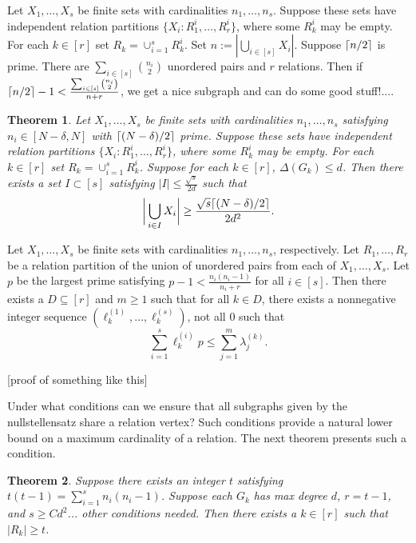 \documentclass[12pt]{article}
\DeclarePairedDelimiter\ceil{\lceil}{\rceil}
\newtheorem{thm}{Theorem}[section] %
\theoremstyle{definition}
\begin{document}
	
	\iffalse
	Let $X_1,\ldots, X_s$ be finite sets with cardinalities $n_1,\ldots, n_s$.  Suppose these sets have independent relation partitions $\{X_i: R_1^{i},\ldots, R_r^{i}\}$, where some $R_k^{i}$ may be empty.  For each $k \in [r]$ set $R_k = \cup_{i=1}^s R_k^i$.  Set $n:= |\bigcup_{i \in [s]}X_i|$.  Suppose $\ceil{n/2}$ is prime.  There are $\sum_{i \in [s]}{n_i \choose 2}$ unordered pairs and $r$ relations.  Then if $\ceil{n/2} -1 < \frac{\sum_{i \in [s]}{n_i \choose 2}}{n+r}$, we get a nice subgraph and can do some good stuff!....
	
	\begin{thm}
		Let $X_1,\ldots, X_s$ be finite sets with cardinalities $n_1,\ldots, n_s$ satisfying $n_i \in [N-\delta, N]$ with $\ceil{(N-\delta)/2}$ prime.  Suppose these sets have independent relation partitions $\{X_i: R_1^{i},\ldots, R_r^{i}\}$, where some $R_k^{i}$ may be empty.  For each $k \in [r]$ set $R_k = \cup_{i=1}^s R_k^i$.  Suppose for each $k \in [r]$, $\Delta(G_k) \leq d$.  Then there exists a set $I \subset [s]$ satisfying $|I| \leq \frac{\sqrt{s}}{2d}$ such that
		$$\biggr|\bigcup_{i \in I}X_i \biggr| \geq \frac{\sqrt{s}\ceil{(N-\delta)/2}}{2d^2}.$$
	\end{thm}
	
	Let $X_1, \ldots, X_s$ be finite sets with cardinalities $n_1,\ldots, n_s$, respectively.  Let $R_1, \ldots, R_r$ be a relation partition of the union of unordered pairs from each of $X_1, \ldots, X_s$.  Let $p$ be the largest prime satisfying $p-1 < \tfrac{n_i(n_i-1)}{n_i+r}$ for all $i \in [s]$.  Then there exists a $D \subseteq [r]$ and $m \geq 1$ such that for all $k \in D$, there exists a nonnegative integer sequence $(\ell_k^{(1)}, \ldots, \ell_k^{(s)})$, not all $0$ such that
	$$ \sum_{i = 1}^s\ell_k^{(i)}p \leq \sum_{j=1}^m \lambda_j^{(k)}.$$
	
	[proof of something like this]
	
	Under what conditions can we ensure that all subgraphs given by the nullstellensatz share a relation vertex?  Such conditions provide a natural lower bound on a maximum cardinality of a relation.  The next theorem presents such a condition.
	
	\begin{thm}
		Suppose there exists an integer $t$ satisfying $t(t-1) = \sum_{i=1}^s n_i(n_i-1)$.  Suppose each $G_k$ has max degree $d$, $r = t-1$, and $s \geq Cd^2$... other conditions needed.  Then there exists a $k \in [r]$ such that $|R_k| \geq t$.
	\end{thm}
\end{document}
